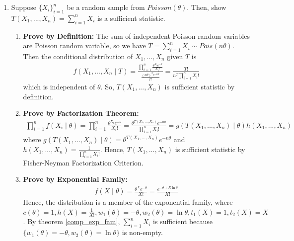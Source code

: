\documentclass[11pt]{elegantbook}
\begin{document}
\begin{example}\quad
    \begin{enumerate}
        \item Suppose $\{X_i\}_{i=1}^n$ be a random sample from $Poisson(\theta)$. Then, show $T(X_1,...,X_n)=\sum_{i=1}^n X_i$ is a sufficient statistic.
        \begin{enumerate}
            \item \textbf{Prove by Definition:} The sum of independent Poisson random variables are Poisson random variable, so we have $T=\sum_{i=1}^n X_i\sim Pois(n\theta)$. Then the conditional distribution of $X_1,...,X_n$ given $T$ is
            \begin{equation}
                \begin{aligned}
                    f(X_1,...,X_n\mid T)=\frac{\prod_{i=1}^n\frac{\theta^{X_i} e^{-\theta}}{X_i!}}{\frac{(n\theta)^{T} e^{-n\theta}}{T!}}=\frac{T!}{n^T\prod_{i=1}^nX_i!}
                \end{aligned}
                \nonumber
            \end{equation}
            which is independent of $\theta$. So, $T(X_1,...,X_n)$ is sufficient statistic by definition.
            \item \textbf{Prove by Factorization Theorem:}
            \begin{equation}
                \begin{aligned}
                    \prod_{i=1}^n f(X_i\mid\theta)=\prod_{i=1}^n\frac{\theta^{X_i} e^{-\theta}}{X_i!}=\frac{\theta^{T(X_1,...,X_n)} e^{-n\theta}}{\prod_{i=1}^n X_i!}=g(T(X_1,...,X_n)\mid\theta)h(X_1,...,X_n)
                \end{aligned}
                \nonumber
            \end{equation}
            where $g(T(X_1,...,X_n)\mid\theta)=\theta^{T(X_1,...,X_n)} e^{-n\theta}$ and $h(X_1,...,X_n)=\frac{1}{\prod_{i=1}^n X_i!}$. Hence, $T(X_1,...,X_n)$ is sufficient statistic by Fisher-Neyman Factorization Criterion.
            \item \textbf{Prove by Exponential Family:}
            \begin{equation}
                \begin{aligned}
                    f(X\mid\theta)=\frac{\theta^X e^{-\theta}}{X!}=\frac{e^{-\theta+X\ln\theta}}{ X!}
                \end{aligned}
                \nonumber
            \end{equation}
            Hence, the distribution is a member of the exponential family, where $c(\theta)=1,h(X)=\frac{1}{X!}, w_1(\theta)=-\theta,w_2(\theta)=\ln\theta,t_1(X)=1,t_2(X)=X$. By theorem \ref{comp_exp_fam}, $\sum_{i=1}^n X_i$ is sufficient because $\{w_1(\theta)=-\theta,w_2(\theta)=\ln\theta\}$ is non-empty.

\end{enumerate}
\end{enumerate}
\end{example}
\end{document}
